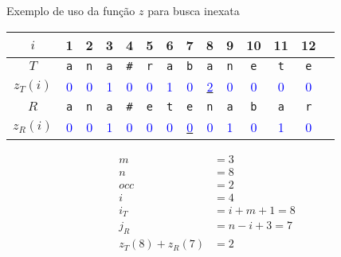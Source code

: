 \begin{frame}[fragile]{Exemplo de uso da função $z$ para busca inexata}

    \begin{center}
    \begin{tabular}{c|ccccccccccccc}
        $i$ & 1 & 2 & 3 & 4 & 5 & 6 & 7 & 8 & 9 & 10 & 11 & 12 \\
        \hline
        $T$
& \texttt{\textcolor{red!80!black}{a}} 
& \texttt{\textcolor{red!80!black}{n}} 
& \texttt{\textcolor{red!80!black}{a}} 
& \texttt{\textcolor{red!80!black}{\#}} 
& \texttt{\textcolor{red!80!black}{r}} 
& \texttt{\textcolor{red!80!black}{a}} 
& \texttt{\textcolor{red!80!black}{b}} 
& \texttt{\textcolor{red!80!black}{a}} 
& \texttt{\textcolor{red!80!black}{n}} 
& \texttt{\textcolor{red!80!black}{e}} 
& \texttt{\textcolor{red!80!black}{t}} 
& \texttt{\textcolor{red!80!black}{e}} 
\\
        $z_T(i)$
& \textcolor{blue}{0} 
& \textcolor{blue}{0} 
& \textcolor{blue}{1} 
& \textcolor{blue}{0} 
& \textcolor{blue}{0} 
& {\textcolor{blue}{1}}
& \textcolor{blue}{0} 
& \underline{\textcolor{blue}{2}}
& \textcolor{blue}{0} 
& \textcolor{blue}{0} 
& \textcolor{blue}{0} 
& \textcolor{blue}{0} 
\\
        $R$
& \texttt{\textcolor{red!80!black}{a}} 
& \texttt{\textcolor{red!80!black}{n}} 
& \texttt{\textcolor{red!80!black}{a}} 
& \texttt{\textcolor{red!80!black}{\#}} 
& \texttt{\textcolor{red!80!black}{e}} 
& \texttt{\textcolor{red!80!black}{t}} 
& \texttt{\textcolor{red!80!black}{e}} 
& \texttt{\textcolor{red!80!black}{n}} 
& \texttt{\textcolor{red!80!black}{a}} 
& \texttt{\textcolor{red!80!black}{b}} 
& \texttt{\textcolor{red!80!black}{a}} 
& \texttt{\textcolor{red!80!black}{r}} 
\\
        $z_R(i)$
& \textcolor{blue}{0} 
& \textcolor{blue}{0} 
& \textcolor{blue}{1} 
& \textcolor{blue}{0} 
& \textcolor{blue}{0} 
& {\textcolor{blue}{0}}
& \underline{\textcolor{blue}{0}}
& {\textcolor{blue}{0}}
& {\textcolor{blue}{1}}
& \textcolor{blue}{0} 
& \textcolor{blue}{1} 
& \textcolor{blue}{0} 
    \end{tabular}
    \end{center}

    \begin{align*}
        m &= 3 \\
        n &= 8 \\
        occ &= 2 \\
        i &= 4 \\
        i_T &= i + m + 1 = 8 \\
        j_R &= n - i + 3 = 7 \\
        z_T(8) + z_R(7) &= 2 \\
    \end{align*}
\end{frame}
